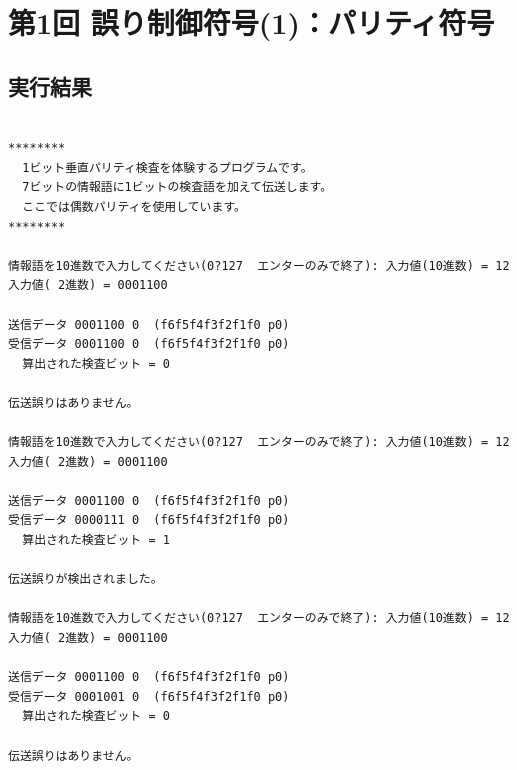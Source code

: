 \documentclass[a4j]{celb-report}
\begin{document}

\newpage %
\section{第1回 誤り制御符号(1)：パリティ符号}

\subsection{実行結果}

%
\begin{lstlisting}[basicstyle=\ttfamily\footnotesize, frame=single]

********
  1ビット垂直パリティ検査を体験するプログラムです。
  7ビットの情報語に1ビットの検査語を加えて伝送します。
  ここでは偶数パリティを使用しています。
********

情報語を10進数で入力してください(0?127  エンターのみで終了): 入力値(10進数) = 12
入力値( 2進数) = 0001100

送信データ 0001100 0  (f6f5f4f3f2f1f0 p0)
受信データ 0001100 0  (f6f5f4f3f2f1f0 p0)
  算出された検査ビット = 0

伝送誤りはありません。

情報語を10進数で入力してください(0?127  エンターのみで終了): 入力値(10進数) = 12
入力値( 2進数) = 0001100

送信データ 0001100 0  (f6f5f4f3f2f1f0 p0)
受信データ 0000111 0  (f6f5f4f3f2f1f0 p0)
  算出された検査ビット = 1

伝送誤りが検出されました。

情報語を10進数で入力してください(0?127  エンターのみで終了): 入力値(10進数) = 12
入力値( 2進数) = 0001100

送信データ 0001100 0  (f6f5f4f3f2f1f0 p0)
受信データ 0001001 0  (f6f5f4f3f2f1f0 p0)
  算出された検査ビット = 0

伝送誤りはありません。

\end{lstlisting}
%
\end{document}
